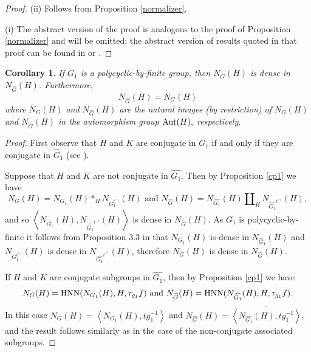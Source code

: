 \documentclass[a4paper,12pt]{article}
\newtheorem{cor}[thm]{Corollary}
\def\aut {{\rm Aut}}
\def\hnn {{\rm HNN}}
\begin{document}
{\begin{proof} (ii)   Follows from Proposition \ref{normalizer}.  

\medskip
(i) The abstract version of the proof is analogous to the proof of  Proposition \ref{normalizer} and will be omitted;  the abstract version of results quoted in that proof  can be found in \cite{S} or \cite{DI}. 
\end{proof}


\begin{cor}\label{8} If $G_1$ is a polycyclic-by-finite group, then $N_{G}(H)$ is dense in $N_{\widehat{G}}(H)$. Furthermore,  $$\overline{N}_{\widehat{G}}(H)=\overline{N}_{G}(H)$$ where $\overline{N}_{G}(H)$ and $\overline{N}_{\widehat{G}}(H)$ are the natural images (by restriction) of $N_{G}(H)$ and $N_{\widehat{G}}(H)$ in the automorphism group $\aut(H),$ respectively. 
\end{cor}

\begin{proof} First observe that $H$ and $K$ are conjugate in $G_1$ if and only if they are conjugate in $\widehat G_1$  (see \cite[ Chapter 4, Theorem 7]{Se}).

Suppose that $H$ and $K$ are not conjugate in $\widehat{G_1}$. Then by Proposition \ref{cp1} we have   $$N_{G}(H)=N_{G_1}(H)*_{H} N_{G_{1}^{t^{-1}}}(H) \mbox{ and } N_{\widehat{G}}(H)=N_{\widehat{G_1}}(H)\amalg_{H} N_{\widehat{G_{1}}^{t^{-1}}}(H),$$ and so  $\left\langle N_{\widehat{G_1}}(H), N_{\widehat{G_{1}}^{t^{-1}}}(H)\right\rangle$ is dense in $N_{\widehat{G}}(H)$. As $G_1$ is polycyclic-by-finite it follows from Proposition 3.3 in \cite{RSZ} that $N_{G_{1}}(H)$ is dense in $N_{\widehat{G}_{1}}(H)$ and $N_{G_{1}^{t^{-1}}}(H)$ is dense in $N_{\widehat{G_{1}}^{t^{-1}}}(H)$, therefore  $N_{G}(H)$ is dense in $N_{\widehat{G}}(H)$. 

If $H$ and $K$ are conjugate subgroups in $\widehat{G_1}$, then by Proposition \ref{cp1} we have $$N_{G}(H)=\hnn(N_{G_1}(H), H, \tau_{g_1} f) \mbox{ and } N_{\widehat{G}}(H)=\hnn(N_{\widehat{G_1}}(H), H, \tau_{g_1} f).$$ In this case $N_{G}(H)=\left \langle N_{G_1}(H), tg_1^{-1}\right\rangle$ and $N_{\widehat{G}}(H)=\overline{\left \langle N_{\widehat{G_1}}(H), tg_1^{-1}\right\rangle}$, and the result follows similarly as in the case of the non-conjugate associated subgroups. 


\end{proof}}
\end{document}
